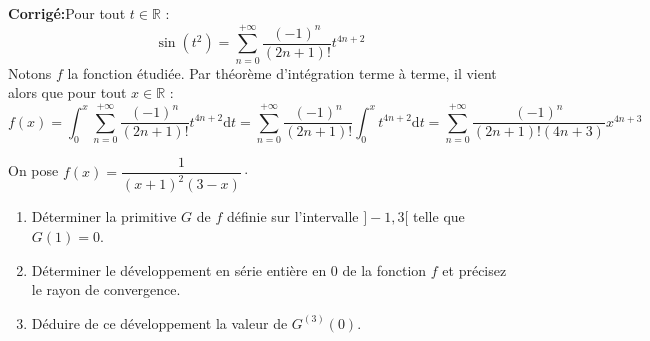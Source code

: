 \documentclass[a4paper,twoside,french,11pt]{VcCours}
\newcommand{\corr}{\textbf{Corrigé:}}
\begin{document}
\corr Pour tout $t\in\mathbb{R}$ : 
\[
\sin(t^2)=\sum_{n=0}^{+\infty}\dfrac{(-1)^n}{(2n+1)!}t^{4n+2}
\]
Notons $f$ la fonction étudiée. Par théorème d'intégration terme à terme, il vient alors que pour tout $x\in\mathbb{R}$ : 
$$f(x)=\int_0^x\sum_{n=0}^{+\infty}\dfrac{(-1)^n}{(2n+1)!}t^{4n+2}\mathrm{d}t=\sum_{n=0}^{+\infty}\dfrac{(-1)^n}{(2n+1)!}\int_0^xt^{4n+2}\mathrm{d}t=\sum_{n=0}^{+\infty}\dfrac{(-1)^n}{(2n+1)!(4n+3)}x^{4n+3}$$

\begin{Exercice}{} On pose $f(x)=\dfrac{1}{(x+1)^{2}(3-x)} \cdot$
\begin{enumerate}
\item Déterminer la primitive $G$ de $f$ définie sur l'intervalle $]-1,3[$ telle que $G(1)=0$.
\item Déterminer le développement en série entière en 0 de la fonction $f$ et précisez le rayon de convergence.
\item Déduire de ce développement la valeur de $G^{(3)}(0)$.
\end{enumerate}
\end{Exercice}
\end{document}
